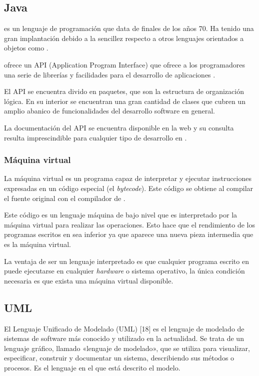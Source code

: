 \subsection{Java}
\java{} es un lenguaje de programación que data de finales de los años 70. Ha tenido una gran implantación debido a la sencillez respecto a otros lenguajes orientados a objetos como \cpp{}.

\java{} ofrece un API (Application Program Interface) que ofrece a los programadores una serie de librerías y facilidades para el desarrollo de aplicaciones \java{}.

El API se encuentra divido en paquetes, que son la estructura de organización lógica. En su interior se encuentran una gran cantidad de clases que cubren un amplio abanico de funcionalidades del desarrollo software en general.

La documentación del API se encuentra disponible en la web y su consulta resulta imprescindible para cualquier tipo de desarrollo en \java{}.

\subsubsection*{Máquina virtual}
La máquina virtual es un programa capaz de interpretar y ejecutar instrucciones expresadas en un código especial (el \java{} \textit{bytecode}). Este código se obtiene al compilar el fuente original con el compilador de \java{}.

Este código es un lenguaje máquina de bajo nivel que es interpretado por la máquina virtual para realizar las operaciones. Esto hace que el rendimiento de los programas escritos en \java{} sea inferior ya que aparece una nueva pieza intermedia que es la máquina virtual.

La ventaja de ser un lenguaje interpretado es que cualquier programa escrito en \java{} puede ejecutarse en cualquier \textit{hardware} o sistema operativo, la única condición necesaria es que exista una máquina virtual disponible.

\subsection{UML}
El Lenguaje Unificado de Modelado (UML) [18] es el lenguaje de modelado de sistemas de software más conocido y utilizado en la actualidad. Se trata de un lenguaje gráfico, llamado «lenguaje de modelado», que se utiliza para visualizar, especificar, construir y documentar un sistema, describiendo sus métodos o procesos. Es el lenguaje en el que está descrito el modelo.

